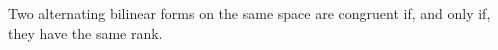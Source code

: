 Two alternating bilinear forms on the same space are congruent if, and only if, they have the same rank.
